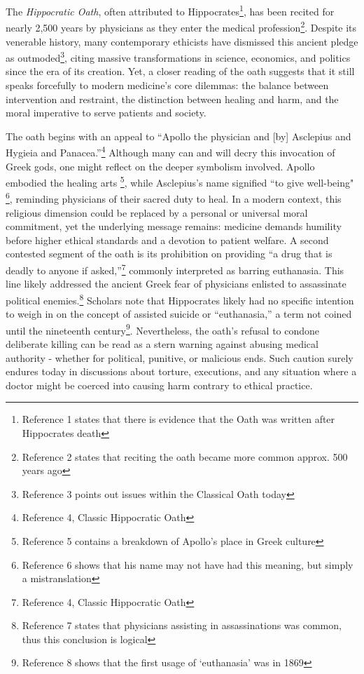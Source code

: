 \documentclass[12pt]{article}
\begin{document}
\bigskip

The \textit{Hippocratic Oath}, often attributed to Hippocrates\footnote{Reference 1 states that there is evidence that the Oath was written after Hippocrates death},
has been recited for nearly 2,500 years by physicians as they enter the medical profession\footnote{Reference 2 states that reciting the oath became more common approx. 500 years ago}. 
Despite its venerable history, many contemporary ethicists have dismissed this ancient pledge as outmoded\footnote{Reference 3 points out issues within the Classical Oath today}, 
citing massive transformations in science, economics, and politics since the era of its creation. 
Yet, a closer reading of the oath suggests that it still speaks forcefully to modern medicine’s core dilemmas: 
the balance between intervention and restraint, the distinction between healing and harm, and the moral imperative to serve patients and society.

\bigskip

The oath begins with an appeal to “Apollo the physician and [by] Asclepius and Hygieia and Panacea.”\footnote{Reference 4, Classic Hippocratic Oath}
Although many can and will decry this invocation of Greek gods, one might reflect on the deeper symbolism involved. Apollo embodied the healing arts
\footnote{Reference 5 contains a breakdown of Apollo's place in Greek culture}, while Asclepius’s name signified ``to give well-being"
\footnote{Reference 6 shows that his name may not have had this meaning, but simply a mistranslation}, reminding physicians of their sacred duty to 
heal. In a modern context, this religious dimension could be replaced by a personal or universal moral commitment, yet the underlying message remains: 
medicine demands humility before higher ethical standards and a devotion to patient welfare. A second contested segment of the oath is its prohibition 
on providing “a drug that is deadly to anyone if asked,”\footnote{Reference 4, Classic Hippocratic Oath} commonly interpreted as barring euthanasia. 
This line likely addressed the ancient Greek fear of physicians enlisted to assassinate political enemies.\footnote{Reference 7 states that physicians 
assisting in assassinations was common, thus this conclusion is logical} Scholars note that Hippocrates likely had no specific intention to weigh in on 
the concept of assisted suicide or “euthanasia,” a term not coined until the nineteenth century\footnote{Reference 8 shows that the first usage of 
`euthanasia' was in 1869}. Nevertheless, the oath’s refusal to condone deliberate killing can be read as a stern warning against abusing medical 
authority - whether for political, punitive, or malicious ends. Such caution surely endures today in discussions about torture, executions, and 
any situation where a doctor might be coerced into causing harm contrary to ethical practice.
\end{document}
